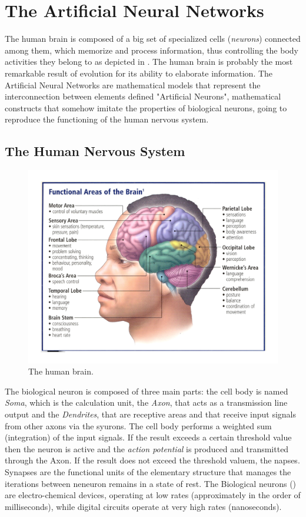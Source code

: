 \section{The Artificial Neural Networks}

The human brain is composed of a big set of specialized cells (\textit{neurons}) connected among them, which memorize and process information, thus controlling the body activities they belong to as depicted in . The human brain is probably the most remarkable result of evolution for its ability to elaborate information. 
The Artificial Neural Networks are mathematical models that represent the interconnection between elements defined "Artificial Neurons", mathematical constructs that somehow imitate the properties of biological neurons, going to reproduce the functioning of the human nervous system.

\subsection{The Human Nervous System} 

\begin{figure}[t]
\centering
\includegraphics[width=0.65\linewidth]{img/Brain}
\caption{The human brain.}
\label{fig:brain}
\end{figure}

The biological neuron is composed of three main parts: the cell body is named \textit{Soma}, which is the calculation unit, the \textit{Axon}, that acts as a transmission line output and the \textit{Dendrites}, that are receptive areas and that receive input signals from other axons via the syurons. The cell body performs a weighted sum (integration) of the input signals. If the result exceeds a certain threshold value then the neuron is active and the \textit{action potential}  is produced and transmitted through the Axon. If the result does not exceed the threshold valuem, the napses. 
Synapses are the functional units of the elementary structure that manages the iterations between neneuron remains in a state of rest. 
The Biological neurons () are electro-chemical devices, operating at low rates (approximately in the order of milliseconds), while digital circuits operate at very high rates (nanoseconds).

